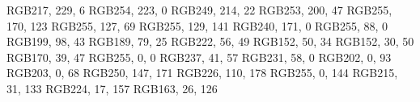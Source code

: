 \definecolor{GreenYellow}       {RGB}{217, 229, 6} 	    %
\definecolor{Yellow}            {RGB}{254, 223, 0} 	    %
\definecolor{Goldenrod}         {RGB}{249, 214, 22} 	%
\definecolor{Dandelion}         {RGB}{253, 200, 47} 	%
\definecolor{Apricot}           {RGB}{255, 170, 123} 	%
\definecolor{Peach}             {RGB}{255, 127, 69} 	%
\definecolor{Melon}             {RGB}{255, 129, 141} 	%
\definecolor{YellowOrange}      {RGB}{240, 171, 0} 	    %
\definecolor{Orange}            {RGB}{255, 88, 0} 	    %
\definecolor{BurntOrange}       {RGB}{199, 98, 43} 	    %
\definecolor{Bittersweet}       {RGB}{189, 79, 25} 	    %
\definecolor{RedOrange}         {RGB}{222, 56, 49} 	    %
\definecolor{Mahogany}          {RGB}{152, 50, 34} 	    %
\definecolor{Maroon}            {RGB}{152, 30, 50} 	    %
\definecolor{BrickRed}          {RGB}{170, 39, 47} 	    %
\definecolor{Red}               {RGB}{255, 0, 0}        %
\definecolor{BrilliantRed}      {RGB}{237, 41, 57} 	    %
\definecolor{OrangeRed}         {RGB}{231, 58, 0} 	    %
\definecolor{RubineRed}         {RGB}{202, 0, 93}       %
\definecolor{WildStrawberry}    {RGB}{203, 0, 68} 	    %
\definecolor{Salmon}            {RGB}{250, 147, 171} 	%
\definecolor{CarnationPink}     {RGB}{226, 110, 178} 	%
\definecolor{Magenta}           {RGB}{255, 0, 144} 	    %
\definecolor{VioletRed}         {RGB}{215, 31, 133} 	%
\definecolor{Rhodamine}         {RGB}{224, 17, 157} 	%
\definecolor{Mulberry}          {RGB}{163, 26, 126} 	%
